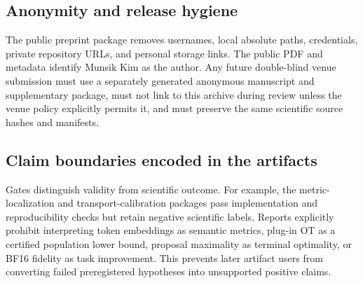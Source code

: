 \subsection{Anonymity and release hygiene}
The public preprint package removes usernames, local absolute paths, credentials, private repository URLs, and personal storage links. The public PDF and metadata identify Munsik Kim as the author. Any future double-blind venue submission must use a separately generated anonymous manuscript and supplementary package, must not link to this archive during review unless the venue policy explicitly permits it, and must preserve the same scientific source hashes and manifests.

\subsection{Claim boundaries encoded in the artifacts}
Gates distinguish validity from scientific outcome. For example, the metric-localization and transport-calibration packages pass implementation and reproducibility checks but retain negative scientific labels. Reports explicitly prohibit interpreting token embeddings as semantic metrics, plug-in OT as a certified population lower bound, proposal maximality as terminal optimality, or BF16 fidelity as task improvement. This prevents later artifact users from converting failed preregistered hypotheses into unsupported positive claims.
